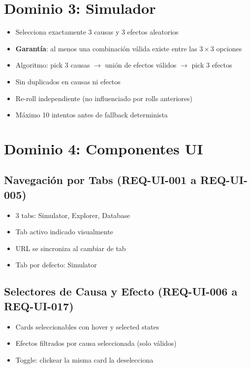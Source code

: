 \documentclass[11pt,a4paper]{report}
\begin{document}
\section{Dominio 3: Simulador}

\begin{itemize}
  \item Selecciona exactamente 3 causas y 3 efectos aleatorios
  \item \textbf{Garantía}: al menos una combinación válida existe entre las $3 \times 3$ opciones
  \item Algoritmo: pick 3 causas $\rightarrow$ unión de efectos válidos $\rightarrow$ pick 3 efectos
  \item Sin duplicados en causas ni efectos
  \item Re-roll independiente (no influenciado por rolls anteriores)
  \item Máximo 10 intentos antes de fallback determinista
\end{itemize}

\section{Dominio 4: Componentes UI}

\subsection{Navegación por Tabs (REQ-UI-001 a REQ-UI-005)}
\begin{itemize}
  \item 3 tabs: Simulator, Explorer, Database
  \item Tab activo indicado visualmente
  \item URL se sincroniza al cambiar de tab
  \item Tab por defecto: Simulator
\end{itemize}

\subsection{Selectores de Causa y Efecto (REQ-UI-006 a REQ-UI-017)}
\begin{itemize}
  \item Cards seleccionables con hover y selected states
  \item Efectos filtrados por causa seleccionada (solo válidos)
  \item Toggle: clickear la misma card la deselecciona
\end{itemize}
\end{document}
